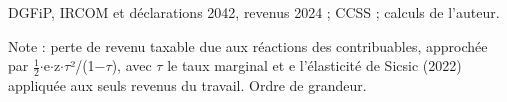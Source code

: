 DGFiP, IRCOM et déclarations 2042, revenus 2024 ; CCSS ; calculs de l'auteur.\par Note : perte de revenu taxable due aux réactions des contribuables, approchée par $\frac{1}{2}$$\cdot$e$\cdot$z$\cdot$$\tau$²/(1$-$$\tau$), avec $\tau$ le taux marginal et e l'élasticité de Sicsic (2022) appliquée aux seuls revenus du travail. Ordre de grandeur.
